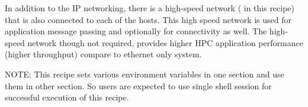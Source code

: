  In addition to the IP networking, there is a high-speed network
(\InfiniBand{} in this recipe) that is also connected to each of the
hosts. This high speed network is used for application message passing and
optionally for \Lustre{} connectivity as well. The high-speed network though not required, provides higher HPC application performance (higher throughput) compare to ethernet only system.

NOTE: This recipe sets various environment variables in one section and use them in other section. So users are expected to use single shell session for successful execution of this recipe. 


